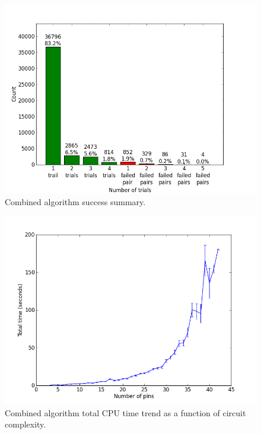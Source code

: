 \begin{figure}[H]
\begin{center}
\includegraphics[width=\textwidth]{Images/final_algorithm_num_trials.png}
\caption{Combined algorithm success summary.}
\label{fig:final_num_trials}
\end{center}
\end{figure}

\begin{figure}[H]
\begin{center}
\includegraphics[width=\textwidth]{Images/final_algorithm_time_trend.png}
\caption{Combined algorithm total CPU time trend as a function of circuit
complexity.}
\label{fig:final_time_trend}
\end{center}
\end{figure}

